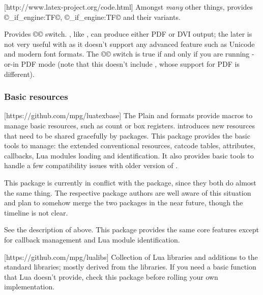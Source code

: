 \documentclass{lltxdoc}
\begin{document}
[http://www.latex-project.org/code.html]
Amongst \emph{many} other things, provides ©\luatex_if_engine:TF©,
©\xetex_if_engine:TF© and their variants.

Provides ©\ifpdf© switch. \luatex, like \pdftex, can produce either PDF or DVI
output; the later is not very useful with \luatex as it doesn't support any
advanced feature such as Unicode and modern font formats. The ©\ifpdf© switch
is true if and only if you are running \pdftex-or-\luatex in PDF mode (note
that this doesn't include \xetex, whose support for PDF is different).

\subsubsection{Basic resources}

[https://github.com/mpg/luatexbase]
The Plain and \latex formats provide macros to manage \tex basic resources,
such as count or box registers. \luatex introduces new resources that need to
be shared gracefully by packages. This package provides the basic tools to
manage: the extended conventional \tex resources, catcode tables, attributes,
callbacks, Lua modules loading and identification. It also provides basic
tools to handle a few compatibility issues with older version of \luatex.

 This package is currently in conflict with the 
package, since they both do almost the same thing. The respective package
authors are well aware of this situation and plan to somehow merge the two
packages in the near future, though the timeline is not clear.

See the description of  above. This package provides the same
core features except for callback management and Lua module identification.

[https://github.com/mpg/lualibs]
Collection of Lua libraries and additions to the standard libraries; mostly
derived from the \context libraries. If you need a basic function that Lua
doesn't provide, check this package before rolling your own implementation.
\end{document}
